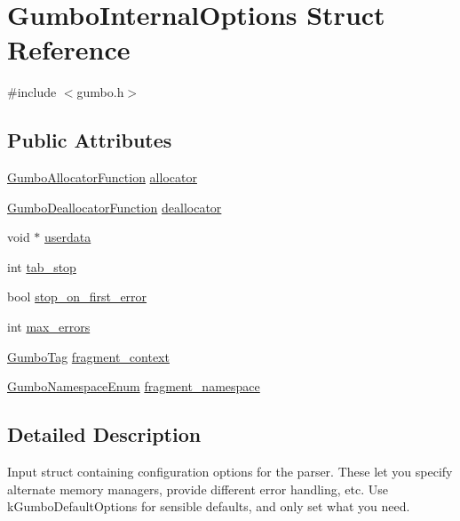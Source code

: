 \hypertarget{struct_gumbo_internal_options}{}\section{Gumbo\+Internal\+Options Struct Reference}
\label{struct_gumbo_internal_options}


{\ttfamily \#include $<$gumbo.\+h$>$}

\subsection*{Public Attributes}
\begin{DoxyCompactItemize}
\item 
\mbox{\hyperlink{gumbo_8h_aaf78769ab19b5fbe291f7977cae899df}{Gumbo\+Allocator\+Function}} \mbox{\hyperlink{struct_gumbo_internal_options_acac0fe2be11fb72dcdb39d9c417dd31d}{allocator}}
\item 
\mbox{\hyperlink{gumbo_8h_a19e07a5e573bf194295141fba654d2ea}{Gumbo\+Deallocator\+Function}} \mbox{\hyperlink{struct_gumbo_internal_options_a02f657a8c26adca403786187741ea00c}{deallocator}}
\item 
void $\ast$ \mbox{\hyperlink{struct_gumbo_internal_options_ab0614a8d24cd66f81028402531ba436a}{userdata}}
\item 
int \mbox{\hyperlink{struct_gumbo_internal_options_aa355be463e9592c127b2a1ef056f6ebe}{tab\+\_\+stop}}
\item 
bool \mbox{\hyperlink{struct_gumbo_internal_options_aa9ab039f1b40708234f78cf3f6e46bd7}{stop\+\_\+on\+\_\+first\+\_\+error}}
\item 
int \mbox{\hyperlink{struct_gumbo_internal_options_a3783862d2151c993cbc7b2243ade614d}{max\+\_\+errors}}
\item 
\mbox{\hyperlink{gumbo_8h_a5a3aa6f4b039f85875d638088e676a0f}{Gumbo\+Tag}} \mbox{\hyperlink{struct_gumbo_internal_options_a7e7e60aee3ec81b2faee2b504a26321f}{fragment\+\_\+context}}
\item 
\mbox{\hyperlink{gumbo_8h_a5792dfd02513e421fb8f083f08e58cc6}{Gumbo\+Namespace\+Enum}} \mbox{\hyperlink{struct_gumbo_internal_options_aacbd6eac053b48200595fea13abec223}{fragment\+\_\+namespace}}
\end{DoxyCompactItemize}


\subsection{Detailed Description}
Input struct containing configuration options for the parser. These let you specify alternate memory managers, provide different error handling, etc. Use k\+Gumbo\+Default\+Options for sensible defaults, and only set what you need. 

